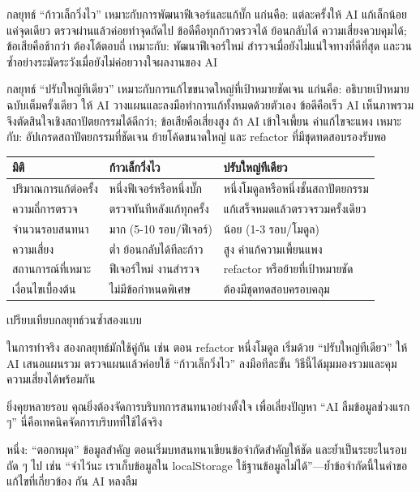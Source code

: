 กลยุทธ์ “ก้าวเล็กวิ่งไว” เหมาะกับการพัฒนาฟีเจอร์และแก้บั๊ก แก่นคือ: แต่ละครั้งให้ AI แก้เล็กน้อยแค่จุดเดียว ตรวจผ่านแล้วค่อยทำจุดถัดไป ข้อดีคือทุกก้าวตรวจได้ ย้อนกลับได้ ความเสี่ยงควบคุมได้; ข้อเสียคือช้ากว่า ต้องโต้ตอบถี่ เหมาะกับ: พัฒนาฟีเจอร์ใหม่ สำรวจเมื่อยังไม่แน่ใจทางที่ดีที่สุด และวนซ้ำอย่างระมัดระวังเมื่อยังไม่ค่อยวางใจผลงานของ AI

กลยุทธ์ “ปรับใหญ่ทีเดียว” เหมาะกับการแก้ไขขนาดใหญ่ที่เป้าหมายชัดเจน แก่นคือ: อธิบายเป้าหมายฉบับเต็มครั้งเดียว ให้ AI วางแผนและลงมือทำการแก้ทั้งหมดด้วยตัวเอง ข้อดีคือเร็ว AI เห็นภาพรวมจึงตัดสินใจเชิงสถาปัตยกรรมได้ดีกว่า; ข้อเสียคือเสี่ยงสูง ถ้า AI เข้าใจเพี้ยน ค่าแก้ไขจะแพง เหมาะกับ: อัปเกรดสถาปัตยกรรมที่ชัดเจน ย้ายโค้ดขนาดใหญ่ และ refactor ที่มีชุดทดสอบรองรับพอ

\begin{center}
\begin{tabularx}{\linewidth}{|X|X|X|}
\hline
\textbf{มิติ} & \textbf{ก้าวเล็กวิ่งไว} & \textbf{ปรับใหญ่ทีเดียว} \tabularnewline
\hline
ปริมาณการแก้ต่อครั้ง & หนึ่งฟีเจอร์หรือหนึ่งบั๊ก & หนึ่งโมดูลหรือหนึ่งชั้นสถาปัตยกรรม \tabularnewline
ความถี่การตรวจ & ตรวจทันทีหลังแก้ทุกครั้ง & แก้เสร็จหมดแล้วตรวจรวมครั้งเดียว \tabularnewline
จำนวนรอบสนทนา & มาก (5-10 รอบ/ฟีเจอร์) & น้อย (1-3 รอบ/โมดูล) \tabularnewline
ความเสี่ยง & ต่ำ ย้อนกลับได้ทีละก้าว & สูง ค่าแก้ความเพี้ยนแพง \tabularnewline
สถานการณ์ที่เหมาะ & ฟีเจอร์ใหม่ งานสำรวจ & refactor หรือย้ายที่เป้าหมายชัด \tabularnewline
เงื่อนไขเบื้องต้น & ไม่มีข้อกำหนดพิเศษ & ต้องมีชุดทดสอบครอบคลุม \tabularnewline
\hline
\end{tabularx}
\end{center}

\begin{center}\small\color{gray}เปรียบเทียบกลยุทธ์วนซ้ำสองแบบ\end{center}

ในการทำจริง สองกลยุทธ์มักใช้คู่กัน เช่น ตอน refactor หนึ่งโมดูล เริ่มด้วย “ปรับใหญ่ทีเดียว” ให้ AI เสนอแผนรวม ตรวจแผนแล้วค่อยใช้ “ก้าวเล็กวิ่งไว” ลงมือทีละขั้น วิธีนี้ได้มุมมองรวมและคุมความเสี่ยงได้พร้อมกัน


ยิ่งคุยหลายรอบ คุณยิ่งต้องจัดการบริบทการสนทนาอย่างตั้งใจ เพื่อเลี่ยงปัญหา “AI ลืมข้อมูลช่วงแรก ๆ” นี่คือเทคนิคจัดการบริบทที่ใช้ได้จริง

หนึ่ง: “ตอกหมุด” ข้อมูลสำคัญ ตอนเริ่มบทสนทนาเขียนข้อจำกัดสำคัญให้ชัด และย้ำเป็นระยะในรอบถัด ๆ ไป เช่น “จำไว้นะ เราเก็บข้อมูลใน localStorage ใช้ฐานข้อมูลไม่ได้”—ย้ำข้อจำกัดนี้ในคำขอแก้ไขที่เกี่ยวข้อง กัน AI หลงลืม

